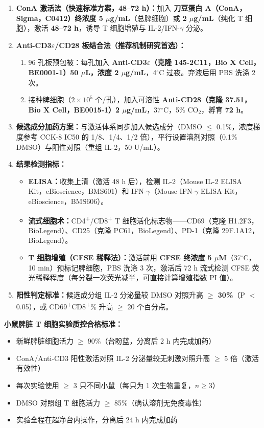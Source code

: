 \documentclass[12pt,a4paper,twoside]{article}
\begin{document}
\begin{enumerate}
  \item \textbf{ConA 激活法（快速标准方案，48--72 h）：}加入 \textbf{刀豆蛋白 A（ConA，Sigma，C0412）终浓度 5 $\mu$g/mL}（总脾细胞）或 \textbf{2 $\mu$g/mL}（纯化 T 细胞），激活 \textbf{48--72 h}，诱导 T 细胞增殖与 IL-2/IFN-$\gamma$ 分泌。
  \item \textbf{Anti-CD3$\varepsilon$/CD28 板结合法（推荐机制研究首选）：}
  \begin{enumerate}
    \item 96 孔板预包被：每孔加入 \textbf{Anti-CD3$\varepsilon$（克隆 145-2C11，Bio X Cell，BE0001-1）50 $\mu$L，浓度 2 $\mu$g/mL}，4$^{\circ}$C 过夜。弃液后用 PBS 洗涤 2 次。
    \item 接种脾细胞（$2 \times 10^5$ 个/孔），加入可溶性 \textbf{Anti-CD28（克隆 37.51，Bio X Cell，BE0015-1）2 $\mu$g/mL}，37$^{\circ}$C，5\% CO$_2$，孵育 \textbf{72 h}。
  \end{enumerate}
  \item \textbf{候选成分加药方案：}与激活体系同步加入候选成分（DMSO $\leq$ 0.1\%，浓度梯度参考 CCK-8 IC50 的 1/8、1/4、1/2 倍），平行设置溶剂对照（0.1\% DMSO）与阳性对照（重组 IL-2，50 U/mL）。
  \item \textbf{结果检测指标：}
  \begin{itemize}
    \item \textbf{ELISA：}收集上清（激活 48 h 后），检测 IL-2（Mouse IL-2 ELISA Kit，eBioscience，BMS601）和 IFN-$\gamma$（Mouse IFN-$\gamma$ ELISA Kit，eBioscience，BMS606）。
    \item \textbf{流式细胞术：}CD4\textsuperscript{+}/CD8\textsuperscript{+} T 细胞活化标志物——CD69（克隆 H1.2F3，BioLegend）、CD25（克隆 PC61，BioLegend）、PD-1（克隆 29F.1A12，BioLegend）。
    \item \textbf{T 细胞增殖（CFSE 稀释法）：}激活前用 \textbf{CFSE 终浓度 5 $\mu$M}（37$^{\circ}$C，10 min）预标记脾细胞，PBS 洗涤 3 次，激活后 72 h 流式检测 CFSE 荧光稀释程度（每分裂一次荧光减半，可直接计算增殖指数 PI 值）。
  \end{itemize}
  \item \textbf{阳性判定标准：}候选成分组 IL-2 分泌量较 DMSO 对照升高 \textbf{$\geq$ 30\%}（P $<$ 0.05），或 CD69\textsuperscript{+}CD8\textsuperscript{+}\% 升高 $\geq$ 20 个百分点。
\end{enumerate}

\begin{qcbox}
\textbf{小鼠脾脏 T 细胞实验质控合格标准：}
\begin{itemize}
  \item 新鲜脾脏细胞活力 $\geq$ 90\%（台盼蓝，分离后 2 h 内完成加药）
  \item ConA/Anti-CD3 阳性激活对照 IL-2 分泌量较无刺激对照升高 $\geq$ 5 倍（激活有效性）
  \item 每次实验使用 $\geq$ 3 只不同小鼠（每只为 1 次生物重复，$n \geq 3$）
  \item DMSO 对照组 T 细胞活力 $\geq$ 85\%（确认溶剂无免疫毒性）
  \item 实验全程在超净台内操作，分离后 24 h 内完成加药 
\end{itemize}
\end{qcbox}
\end{document}
